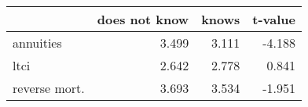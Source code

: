 \begin{tabular}{lrrr}
\toprule
{} &  does not know &  knows &  t-value \\
\midrule
annuities     &          3.499 &  3.111 &   -4.188 \\
ltci          &          2.642 &  2.778 &    0.841 \\
reverse mort. &          3.693 &  3.534 &   -1.951 \\
\bottomrule
\end{tabular}
